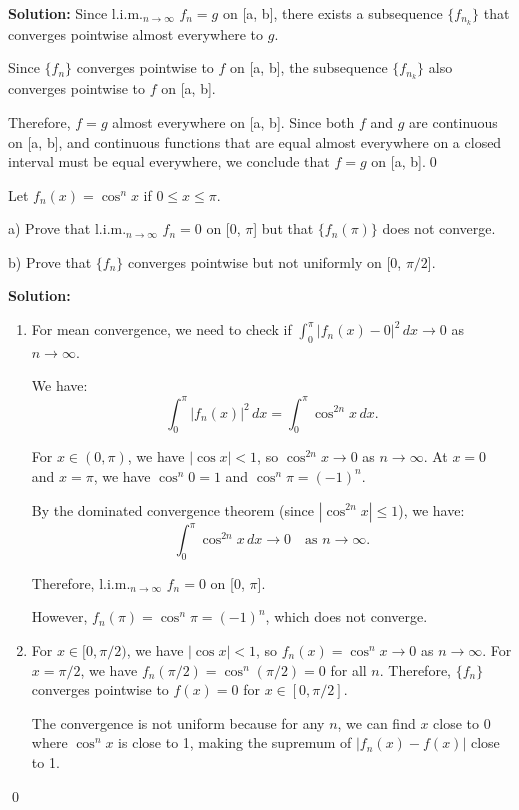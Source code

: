 \bigskip\noindent\textbf{Solution:} Since l.i.m.\(_{n\to\infty}\) \( f_n = g \) on [a, b], there exists a subsequence \( \{f_{n_k}\} \) that converges pointwise almost everywhere to \( g \).

Since \( \{f_n\} \) converges pointwise to \( f \) on [a, b], the subsequence \( \{f_{n_k}\} \) also converges pointwise to \( f \) on [a, b].

Therefore, \( f = g \) almost everywhere on [a, b]. Since both \( f \) and \( g \) are continuous on [a, b], and continuous functions that are equal almost everywhere on a closed interval must be equal everywhere, we conclude that \( f = g \) on [a, b].\qed


\begin{problembox}
Let \( f_n(x) = \cos^n x \) if \( 0 \leq x \leq \pi \).

a) Prove that l.i.m.\(_{n\to\infty}\) \( f_n = 0 \) on [0, \(\pi\)] but that \( \{f_n(\pi)\} \) does not converge.

b) Prove that \( \{f_n\} \) converges pointwise but not uniformly on [0, \(\pi/2\)].
\end{problembox}

\bigskip\noindent\textbf{Solution:}
\begin{enumerate}[label=(\alph*)]
\item For mean convergence, we need to check if \( \int_0^\pi |f_n(x) - 0|^2 \, dx \to 0 \) as \( n \to \infty \).

We have:
\[\int_0^\pi |f_n(x)|^2 \, dx = \int_0^\pi \cos^{2n} x \, dx.\]

For \( x \in (0, \pi) \), we have \( |\cos x| < 1 \), so \( \cos^{2n} x \to 0 \) as \( n \to \infty \). At \( x = 0 \) and \( x = \pi \), we have \( \cos^n 0 = 1 \) and \( \cos^n \pi = (-1)^n \).

By the dominated convergence theorem (since \( |\cos^{2n} x| \leq 1 \)), we have:
\[\int_0^\pi \cos^{2n} x \, dx \to 0 \quad \text{as } n \to \infty.\]

Therefore, l.i.m.\(_{n\to\infty}\) \( f_n = 0 \) on [0, \(\pi\)].

However, \( f_n(\pi) = \cos^n \pi = (-1)^n \), which does not converge.

\item For \( x \in [0, \pi/2) \), we have \( |\cos x| < 1 \), so \( f_n(x) = \cos^n x \to 0 \) as \( n \to \infty \). For \( x = \pi/2 \), we have \( f_n(\pi/2) = \cos^n(\pi/2) = 0 \) for all \( n \). Therefore, \( \{f_n\} \) converges pointwise to \( f(x) = 0 \) for \( x \in [0, \pi/2] \).

The convergence is not uniform because for any \( n \), we can find \( x \) close to 0 where \( \cos^n x \) is close to 1, making the supremum of \( |f_n(x) - f(x)| \) close to 1.
\end{enumerate}\qed


